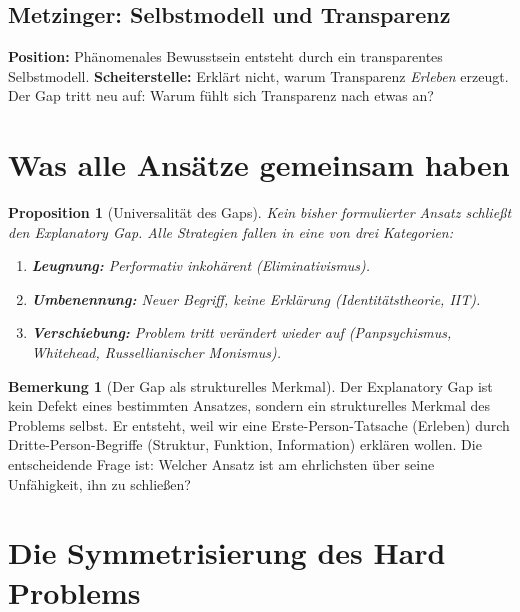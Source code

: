 \documentclass[11pt,a4paper]{article}
\theoremstyle{plain}
\newtheorem{proposition}{Proposition}[section]
\theoremstyle{definition}
\newtheorem{remark}{Bemerkung}[section]
\begin{document}
\subsection{Metzinger: Selbstmodell und Transparenz}
\textbf{Position:} Ph\"{a}nomenales Bewusstsein entsteht durch ein transparentes
Selbstmodell.
\textbf{Scheiterstelle:} Erkl\"{a}rt nicht, warum Transparenz \emph{Erleben} erzeugt.
Der Gap tritt neu auf: Warum f\"{u}hlt sich Transparenz nach etwas an?

\section{Was alle Ans\"{a}tze gemeinsam haben}

\begin{proposition}[Universalit\"{a}t des Gaps]
Kein bisher formulierter Ansatz schlie\ss{}t den Explanatory Gap. Alle Strategien fallen
in eine von drei Kategorien:
\begin{enumerate}[label=(\alph*)]
  \item \textbf{Leugnung:} Performativ inkoh\"{a}rent (Eliminativismus).
  \item \textbf{Umbenennung:} Neuer Begriff, keine Erkl\"{a}rung (Identit\"{a}tstheorie,
        IIT).
  \item \textbf{Verschiebung:} Problem tritt ver\"{a}ndert wieder auf (Panpsychismus,
        Whitehead, Russellianischer Monismus).
\end{enumerate}
\end{proposition}

\begin{remark}[Der Gap als strukturelles Merkmal]
Der Explanatory Gap ist kein Defekt eines bestimmten Ansatzes, sondern ein strukturelles
Merkmal des Problems selbst. Er entsteht, weil wir eine Erste-Person-Tatsache (Erleben)
durch Dritte-Person-Begriffe (Struktur, Funktion, Information) erkl\"{a}ren wollen. Die
entscheidende Frage ist: \glqq{}Welcher Ansatz ist am ehrlichsten \"{u}ber seine
Unf\"{a}higkeit, ihn zu schlie\ss{}en?\grqq{}
\end{remark}

\section{Die Symmetrisierung des Hard Problems}
\end{document}
